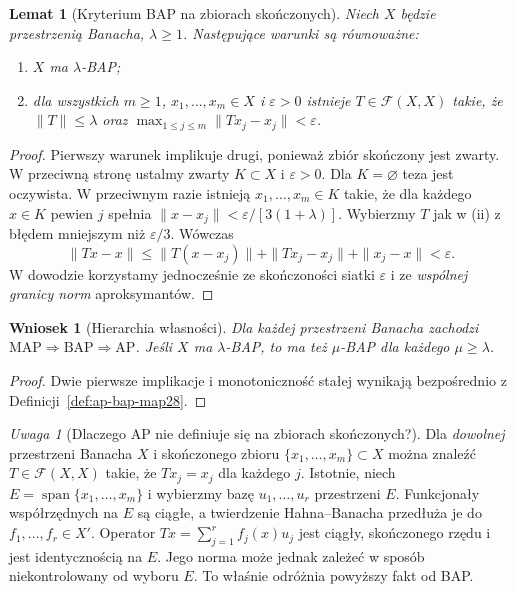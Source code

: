 \documentclass[11pt,a4paper]{article}
\numberwithin{equation}{section}
\theoremstyle{plain}
\newtheorem{lemat}[twierdzenie]{Lemat}
\newtheorem{wniosek}[twierdzenie]{Wniosek}
\theoremstyle{definition}
\theoremstyle{remark}
\newtheorem{uwaga}[twierdzenie]{Uwaga}
\begin{document}
\begin{lemat}[Kryterium BAP na zbiorach skończonych]
\label{lem:finite-bap28}
Niech $X$ będzie przestrzenią Banacha, $\lambda\ge1$.
Następujące warunki są równoważne:
\begin{enumerate}[label=\textup{(\roman*)}]
\item $X$ ma $\lambda$-BAP;
\item dla wszystkich $m\ge1$, $x_1,\ldots,x_m\in X$ i
$\varepsilon>0$ istnieje $T\in\mathcal F(X,X)$ takie,
że $\|T\|\le\lambda$ oraz
$\max_{1\le j\le m}\|Tx_j-x_j\|<\varepsilon$.
\end{enumerate}
\end{lemat}
\begin{proof}
Pierwszy warunek implikuje drugi, ponieważ zbiór skończony
jest zwarty. W przeciwną stronę ustalmy zwarty $K\subset X$
i $\varepsilon>0$. Dla $K=\varnothing$ teza jest oczywista.
W przeciwnym razie istnieją $x_1,\ldots,x_m\in K$
takie, że dla każdego $x\in K$ pewien $j$ spełnia
$\|x-x_j\|<\varepsilon/[3(1+\lambda)]$.
Wybierzmy $T$ jak w (ii) z błędem mniejszym niż
$\varepsilon/3$. Wówczas
\[
\|Tx-x\|\le\|T(x-x_j)\|+\|Tx_j-x_j\|+\|x_j-x\|
<\varepsilon.
\]
W dowodzie korzystamy jednocześnie ze skończoności siatki
$\varepsilon$ i ze \emph{wspólnej granicy norm} aproksymantów.
\end{proof}

\begin{wniosek}[Hierarchia własności]
\label{cor:hierarchy28}
Dla każdej przestrzeni Banacha zachodzi
$\mathrm{MAP}\Rightarrow\mathrm{BAP}\Rightarrow\mathrm{AP}$.
Jeśli $X$ ma $\lambda$-BAP, to ma też $\mu$-BAP
dla każdego $\mu\ge\lambda$.
\end{wniosek}
\begin{proof}
Dwie pierwsze implikacje i monotoniczność stałej wynikają
bezpośrednio z Definicji~\ref{def:ap-bap-map28}.
\end{proof}

\begin{uwaga}[Dlaczego AP nie definiuje się na zbiorach skończonych?]
\label{rem:finite-exact28}
Dla \emph{dowolnej} przestrzeni Banacha $X$ i skończonego
zbioru $\{x_1,\ldots,x_m\}\subset X$ można znaleźć
$T\in\mathcal F(X,X)$ takie, że $Tx_j=x_j$ dla każdego $j$.
Istotnie, niech $E=\operatorname{span}\{x_1,\ldots,x_m\}$
i wybierzmy bazę $u_1,\ldots,u_r$ przestrzeni $E$.
Funkcjonały współrzędnych na $E$ są ciągłe, a twierdzenie
Hahna--Banacha przedłuża je do $f_1,\ldots,f_r\in X'$.
Operator $Tx=\sum_{j=1}^rf_j(x)u_j$ jest ciągły,
skończonego rzędu i jest identycznością na $E$.
Jego norma może jednak zależeć w sposób niekontrolowany
od wyboru $E$. To właśnie odróżnia powyższy fakt od BAP.
\end{uwaga}
\end{document}
